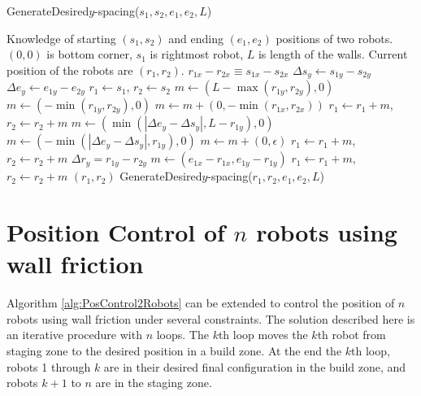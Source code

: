 \begin{algorithm}
\caption{GenerateDesired$y$-spacing($s_1,s_2,e_1,e_2,L$)}\label{alg:YControl}
\begin{algorithmic}[1]
\Require Knowledge of starting $(s_1,s_2)$ and ending $(e_1,e_2)$ positions of  two robots. 
$(0,0)$ is bottom corner, $s_1$ is rightmost robot, 
 $L$ is length of the walls. Current position of the robots are $(r_1,r_2)$.
\Ensure   $ r_{1x} - r_{2x}  \equiv s_{1x} - s_{2x} $   %
\State $ \Delta s_y  \gets s_{1y} - s_{2y} $
\State $ \Delta e_y \gets e_{1y} - e_{2y} $
\State $ r_1 \gets s_1$, $ r_2 \gets s_2$
\State $ m \gets ( L-\max( r_{1y},r_{2y}) ,0)   $ 
\Else 
\State  $ m \gets ( -\min( r_{1y},r_{2y}),0 )    $ 
\EndIf
\State $m  \gets  m + (0, -\min( r_{1x},r_{2x} ))$ 
\State $ r_1 \gets r_1+m$, $ r_2 \gets r_2+m$ 
\State $ m \gets (\min(|\Delta e_y - \Delta s_y |, L- r_{1y}), 0)$  
\Else
\State $ m \gets (-\min(|\Delta e_y - \Delta s_y |, r_{1y}), 0)$
\EndIf 
\State $m  \gets  m + (0, \epsilon)$ 
\State $ r_1 \gets r_1+m$, $ r_2 \gets r_2+m$ 
\State $\Delta r_y = r_{1y} - r_{2y}$
\State   $ m \gets (e_{1x}-r_{1x}, e_{1y}-r_{1y})$
\State $ r_1 \gets r_1+m$, $ r_2 \gets r_2+m$ 
\State  \Return $(r_1,r_2)$
\Else   
\State \Return GenerateDesired$y$-spacing($r_1,r_2,e_1,e_2,L$)
\EndIf
\end{algorithmic}
\end{algorithm}






\section{Position Control of $n$ robots using wall friction}\label{sec:PostionControlnRobots}
Algorithm \ref{alg:PosControl2Robots}  can be extended to control the position of $n$ robots using wall friction under several constraints. The solution described here is an iterative procedure with $n$ loops. The $k$th loop moves the $k$th robot from staging zone to the desired position in a build zone. At the end the $k$th loop, robots 1 through $k$ are in their desired final configuration in the build zone, and robots $k+1$ to $n$ are in the staging zone.

